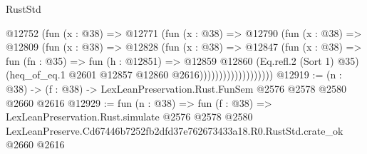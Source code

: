 \begin{lexlean}{RustStd}
\begin{coremodule}
                          @12752
                            (fun (x : @38) =>
                            @12771
                              (fun (x : @38) =>
                              @12790
                                (fun (x : @38) =>
                                @12809
                                  (fun (x : @38) =>
                                  @12828
                                    (fun (x : @38) =>
                                    @12847
                                      (fun (x : @38) =>
                                      fun (fn : @35) =>
                                      fun (h : @12851) =>
                                      @12859
                                        @12860
                                        (Eq.refl.{2} (Sort 1) @35)
                                        (heq_of_eq.{1} @2601 @12857 @12860 @2616)))))))))))))))))))
@12919 := (n : @38) -> (f : @38) -> LexLeanPreservation.Rust.FunSem @2576 @2578 @2580 @2660 @2616
@12929 := fun (n : @38) =>
  fun (f : @38) =>
  LexLeanPreservation.Rust.simulate
    @2576
    @2578
    @2580
    LexLeanPreserve.Cd67446b7252fb2dfd37e762673433a18.R0.RustStd.crate_ok
    @2660
    @2616
\end{coremodule}
\end{lexlean}
